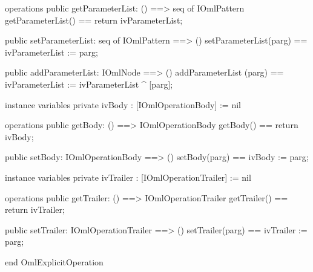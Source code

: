 \begin{vdm_al}
operations
  public getParameterList: () ==> seq of IOmlPattern
  getParameterList() == return ivParameterList;

  public setParameterList: seq of IOmlPattern ==> ()
  setParameterList(parg) == ivParameterList := parg;

  public addParameterList: IOmlNode ==> ()
  addParameterList (parg) == ivParameterList := ivParameterList ^ [parg];

instance variables
  private ivBody : [IOmlOperationBody] := nil

operations
  public getBody: () ==> IOmlOperationBody
  getBody() == return ivBody;

  public setBody: IOmlOperationBody ==> ()
  setBody(parg) == ivBody := parg;

instance variables
  private ivTrailer : [IOmlOperationTrailer] := nil

operations
  public getTrailer: () ==> IOmlOperationTrailer
  getTrailer() == return ivTrailer;

  public setTrailer: IOmlOperationTrailer ==> ()
  setTrailer(parg) == ivTrailer := parg;

end OmlExplicitOperation
\end{vdm_al}

